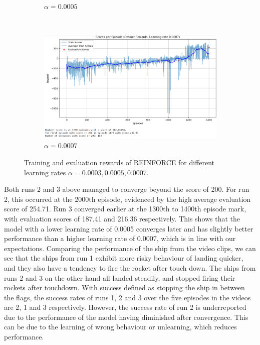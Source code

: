 \documentclass[a4paper, 11pt]{article}
\begin{document}
\begin{figure}[ht]
\begin{center}
\begin{subfigure}{0.48\textwidth}
				\caption{$\alpha=0.0005$}
				\label{fig:pg_lr0.0005}
			\end{subfigure}\\
			\begin{subfigure}{0.48\textwidth}
				\includegraphics[width=\linewidth]{data_policygradient/3learningrate0007run.PNG}
				\caption{$\alpha=0.0007$}
				\label{fig:pg_lr0.0007}
			\end{subfigure} 
		\end{center}
		\caption{Training and evaluation rewards of REINFORCE for different learning rates $\alpha=0.0003,0.0005,0.0007$.}
		\label{fig:pg_lr}
	\end{figure}
	
	Both runs 2 and 3 above managed to converge beyond the score of 200. For run 2, this occurred at the 2000th episode, evidenced by the high average evaluation score of 254.71. Run 3 converged earlier at the 1300th to 1400th episode mark, with evaluation scores of 187.41 and 216.36 respectively. This shows that the model with a lower learning rate of 0.0005 converges later and has slightly better performance than a higher learning rate of 0.0007, which is in line with our expectations. Comparing the performance of the ship from the video clips, we can see that the ships from run 1 exhibit more risky behaviour of landing quicker, and they also have a tendency to fire the rocket after touch down. The ships from runs 2 and 3 on the other hand all landed steadily, and stopped firing their rockets after touchdown. With success defined as stopping the ship in between the flags, the success rates of runs 1, 2 and 3 over the five episodes in the videos are 2, 1 and 3 respectively. However, the success rate of run 2 is underreported due to the performance of the model having diminished after convergence. This can be due to the learning of wrong behaviour or unlearning, which reduces performance.
\end{document}
